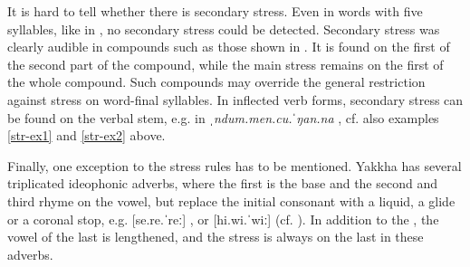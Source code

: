 It is hard to tell whether there is secondary stress. Even in words with five syllables, like in \Last[b], no secondary stress could be detected.  Secondary stress was clearly audible in compounds such as those shown in .  It is found on the first  of the second part of the compound, while the main stress remains on the first  of the whole compound. Such compounds may override the general restriction against stress on word-final syllables. In inflected verb forms, secondary stress can be found on the verbal stem, e.g. in \emph{ˌndum.men.cu.ˈŋan.na} , cf. also examples \ref{str-ex1} and \ref{str-ex2} above.

 

 \begin{table}[htp]	
\caption{Stress in compounds}\label{stresscomp}

\end{table}



Finally, one exception to the stress rules has to be mentioned. Yakkha has several triplicated ideophonic adverbs, where the first  is the base and the second and third  rhyme on the vowel, but replace the initial consonant with a liquid, a glide or a coronal stop, e.g. [se.re.ˈreː] , or [hi.wi.ˈwiː]  (cf. ). In addition to the , the vowel of the last  is lengthened, and the stress is always on the last  in these adverbs.


